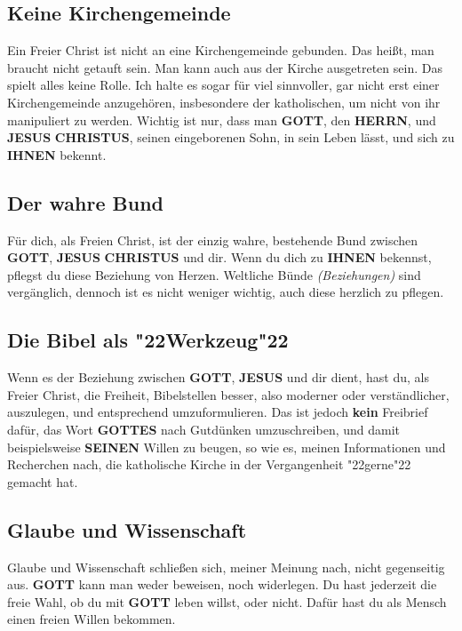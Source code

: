 \documentclass[12pt,a4paper]{article}
\newcommand{\Christus}[0]{\textbf{CHRISTUS}}
\newcommand{\Gottes}[0]{\textbf{GOTTES}}
\newcommand{\Gott}[0]{\textbf{GOTT}}
\newcommand{\Herrn}[0]{\textbf{HERRN}}
\newcommand{\Ihnen}[0]{\textbf{IHNEN}}
\newcommand{\Jesus}[0]{\textbf{JESUS}}
\newcommand{\Seinen}[0]{\textbf{SEINEN}}
\newcommand{\q}[1]{\char"22{#1}\char"22 }
\begin{document}
	\subsection{Keine Kirchengemeinde}
		Ein Freier Christ ist nicht an eine Kirchengemeinde gebunden.
		Das hei{\ss}t,
		man braucht nicht getauft sein.
		Man kann auch aus der Kirche ausgetreten sein.
		Das spielt alles keine Rolle.
		Ich halte es sogar f\"ur viel sinnvoller,
		gar nicht erst einer Kirchengemeinde anzugeh\"oren,
		insbesondere der katholischen,
		um nicht von ihr manipuliert zu werden.
		Wichtig ist nur,
		dass man {\Gott},
		den {\Herrn},
		und {\Jesus} {\Christus},
		seinen eingeborenen Sohn,
		in sein Leben l\"asst,
		und sich zu {\Ihnen} bekennt.
	
	\subsection{Der wahre Bund}
		F\"ur dich,
		als Freien Christ,
		ist der einzig wahre,
		bestehende Bund zwischen {\Gott},
		{\Jesus} {\Christus} und dir.
		Wenn du dich zu {\Ihnen} bekennst,
		pflegst du diese Beziehung von Herzen.
		Weltliche B\"unde \textit{(Beziehungen)} sind verg\"anglich,
		dennoch ist es nicht weniger wichtig,
		auch diese herzlich zu pflegen.
	
	\subsection{Die Bibel als \q{Werkzeug}}
		Wenn es der Beziehung zwischen {\Gott},
		{\Jesus} und dir dient,
		hast du,
		als Freier Christ,
		die Freiheit,
		Bibelstellen besser,
		also moderner oder verst\"andlicher,
		auszulegen,
		und entsprechend umzuformulieren.
		Das ist jedoch \textbf{kein} Freibrief daf\"ur,
		das Wort {\Gottes} nach Gutdünken umzuschreiben,
		und damit beispielsweise {\Seinen} Willen zu beugen,
		so wie es,
		meinen Informationen und Recherchen nach,
		die katholische Kirche in der Vergangenheit \q{gerne} gemacht hat.
	
	\subsection{Glaube und Wissenschaft}
		Glaube und Wissenschaft schlie{\ss}en sich,
		meiner Meinung nach,
		nicht gegenseitig aus.
		{\Gott} kann man weder beweisen,
		noch widerlegen.
		Du hast jederzeit die freie Wahl,
		ob du mit {\Gott} leben willst,
		oder nicht.
		Daf\"ur hast du als Mensch einen freien Willen bekommen.
	
\end{document}
